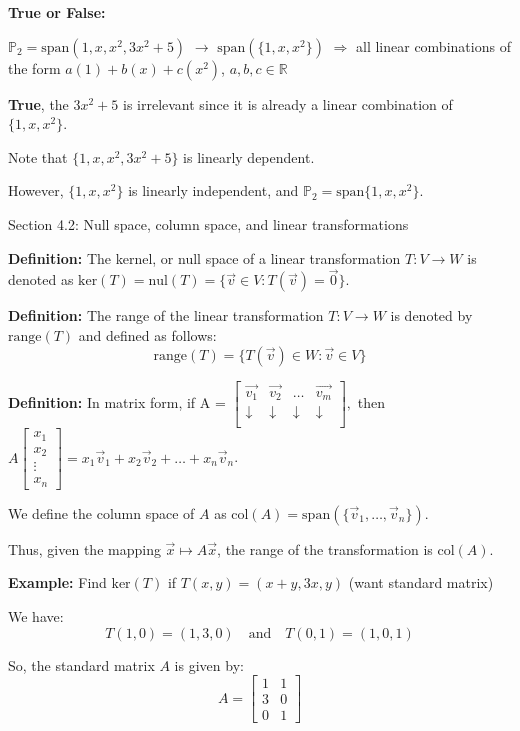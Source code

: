 \documentclass{article}
\begin{document}
\textbf{True or False:}

$\mathbb{P}_2 = \text{span}(1, x, x^2, 3x^2+5)$ $\rightarrow$ $\text{span}(\{1,x,x^2\})$ $\Rightarrow$ all linear combinations of the form $a(1)+b(x)+c(x^2)$, $a,b,c \in \mathbb{R}$

\textbf{True}, the $3x^2+5$ is irrelevant since it is already a linear combination of $\{1, x, x^2\}$.


Note that $\{1, x, x^2, 3x^2+5\}$ is linearly dependent.

However, $\{1, x, x^2\}$ is linearly independent, and $\mathbb{P}_2 = \text{span}\{1, x, x^2\}$.


Section 4.2: Null space, column space, and linear transformations

\textbf{Definition:} The kernel, or null space of a linear transformation $T: V \rightarrow W$ is denoted as $\text{ker}(T) = \text{nul}(T) = \{\vec{v} \in V : T(\vec{v}) = \vec{0}\}$.

\textbf{Definition:} The range of the linear transformation \( T: V \rightarrow W \) is denoted by \( \text{range}(T) \) and defined as follows:
\[ \text{range}(T) = \{ T(\vec{v}) \in W : \vec{v} \in V \} \]

\textbf{Definition:} In matrix form, if A =
$\begin{bmatrix}
    \vec{v_1} & \vec{v_2} & \ldots & \vec{v_m} \\
    \downarrow & \downarrow & \downarrow & \downarrow \\
\end{bmatrix}, $ then \( A \begin{bmatrix} x_1 \\ x_2 \\ \vdots \\ x_n \end{bmatrix} = x_1\vec{v}_1 + x_2\vec{v}_2 + \ldots + x_n\vec{v}_n \).


We define the column space of \( A \) as \( \text{col}(A) = \text{span}(\{\vec{v}_1, \ldots, \vec{v}_n\}) \).

Thus, given the mapping \(\vec{x} \mapsto A\vec{x}\), the range of the transformation is \( \text{col}(A) \).

\textbf{Example:} Find \( \text{ker}(T) \) if \( T(x,y) = (x+y, 3x,y) \) (want standard matrix) 

We have:
\[
T(1,0) = (1,3,0) \quad \text{and} \quad T(0,1) = (1,0,1)
\]

So, the standard matrix \( A \) is given by:
\[
A = \begin{bmatrix} 1 & 1 \\ 3 & 0 \\ 0 & 1 \end{bmatrix}
\]
\end{document}
